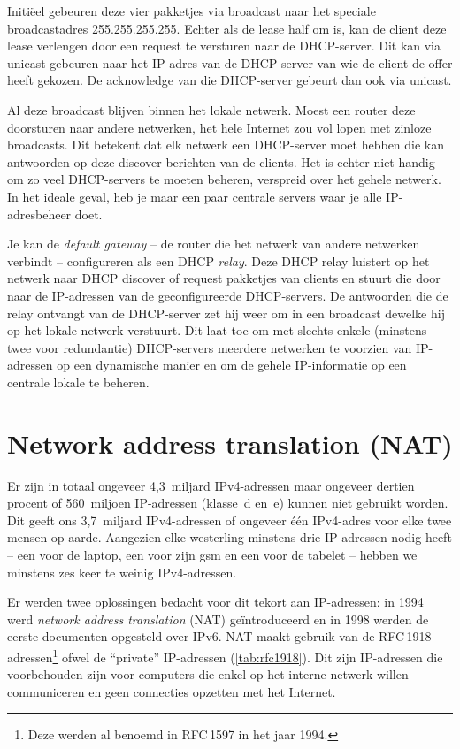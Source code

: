 Initiëel gebeuren deze vier pakketjes via broadcast naar het speciale broadcastadres 255.255.255.255.
Echter als de lease half om is, kan de client deze lease verlengen door een request te versturen naar de DHCP-server.
Dit kan via unicast gebeuren naar het IP-adres van de DHCP-server van wie de client de offer heeft gekozen.
De acknowledge van die DHCP-server gebeurt dan ook via unicast.

Al deze broadcast blijven binnen het lokale netwerk.
Moest een router deze doorsturen naar andere netwerken, het hele Internet zou vol lopen met zinloze broadcasts.
Dit betekent dat elk netwerk een DHCP-server moet hebben die kan antwoorden op deze discover-berichten van de clients.
Het is echter niet handig om zo veel DHCP-servers te moeten beheren, verspreid over het gehele netwerk.
In het ideale geval, heb je maar een paar centrale servers waar je alle IP-adresbeheer doet.

Je kan de \emph{default gateway} -- de router die het netwerk van andere netwerken verbindt -- configureren als een DHCP \emph{relay}.
Deze DHCP relay luistert op het netwerk naar DHCP discover of request pakketjes van clients en stuurt die door naar de IP-adressen van de geconfigureerde DHCP-servers.
De antwoorden die de relay ontvangt van de DHCP-server zet hij weer om in een broadcast dewelke hij op het lokale netwerk verstuurt.
Dit laat toe om met slechts enkele (minstens twee voor redundantie) DHCP-servers meerdere netwerken te voorzien van IP-adressen op een dynamische manier en om de gehele IP-informatie op een centrale lokale te beheren.




\section{Network address translation (NAT)}
Er zijn in totaal ongeveer 4,3~miljard IPv4-adressen maar ongeveer dertien procent of 560~miljoen IP-adressen (klasse~d en~e) kunnen niet gebruikt worden.
Dit geeft ons 3,7~miljard IPv4-adressen of ongeveer één IPv4-adres voor elke twee mensen op aarde.
Aangezien elke westerling minstens drie IP-adressen nodig heeft -- een voor de laptop, een voor zijn gsm en een voor de tabelet -- hebben we minstens zes keer te weinig IPv4-adressen.

Er werden twee oplossingen bedacht voor dit tekort aan IP-adressen:
in 1994 werd \emph{network address translation} (NAT) geïntroduceerd en in 1998 werden de eerste documenten opgesteld over IPv6.
NAT maakt gebruik van de RFC\,1918-adressen\footnote{Deze werden al benoemd in RFC\,1597 in het jaar 1994.} ofwel de ``private'' IP-adressen (\vref{tab:rfc1918}).
Dit zijn IP-adressen die voorbehouden zijn voor computers die enkel op het interne netwerk willen communiceren en geen connecties opzetten met het Internet.

